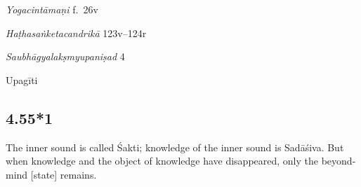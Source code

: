 \begin{ekdosis}

\begin{testimonia}[hp04_055]
\emph{Yogacintāmaṇi} f.~26v
\begin{versinnote}
\end{versinnote}

\emph{Haṭhasaṅketacandrikā} 123v–124r
\begin{versinnote}
\end{versinnote}

\emph{Saubhāgyalakṣmyupaniṣad} 4
\begin{versinnote}
\end{versinnote}
\end{testimonia}

\begin{philcomm}[hp04_055]
\end{philcomm}

\begin{metre}[hp04_055]
Upagīti 
\end{metre}

\subsection*{4.55*1}
\begin{translation}[hp04_055_1]
The inner sound is called Śakti; knowledge of the inner sound is Sadāśiva. But when knowledge and the object of knowledge have disappeared, only the beyond-mind [state] remains.
\end{translation}
%


\end{ekdosis}
